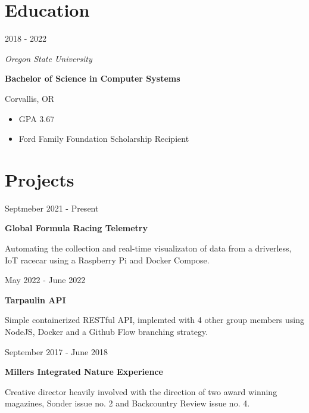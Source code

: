 \documentclass[12pt,letterpaper]{article}
\begin{document}
	
	\noindent
	\begin{minipage}[t]{0.45\linewidth}

		\vspace{0.5cm}

	\section*{Education}
	2018 - 2022
	
	\textit{Oregon State University}


	\textbf{Bachelor of Science in Computer Systems}

	Corvallis, OR
    
    \begin{itemize}
        \item GPA 3.67 
        \item Ford Family Foundation Scholarship Recipient
        
    \end{itemize}
    
    \section*{Projects}
    
    Septmeber 2021 - Present

    \textbf{Global Formula Racing Telemetry}

    Automating the collection and real-time visualizaton of data from a driverless, IoT racecar using a Raspberry Pi and Docker Compose. 
    
    \vspace{0.5cm}
   
    May 2022 - June 2022
   
    \textbf{Tarpaulin API}
  
    Simple containerized RESTful API, implemted with 4 other group members using NodeJS, Docker and a Github Flow branching strategy. 

    \vspace{0.5cm}
 
    September 2017 - June 2018
    
    \textbf{Millers Integrated Nature Experience}
    
    Creative director heavily involved with the direction of two award winning magazines, Sonder issue no. 2 and Backcountry Review issue no. 4.
	
\end{minipage}
\hspace{1cm}
\end{document}
